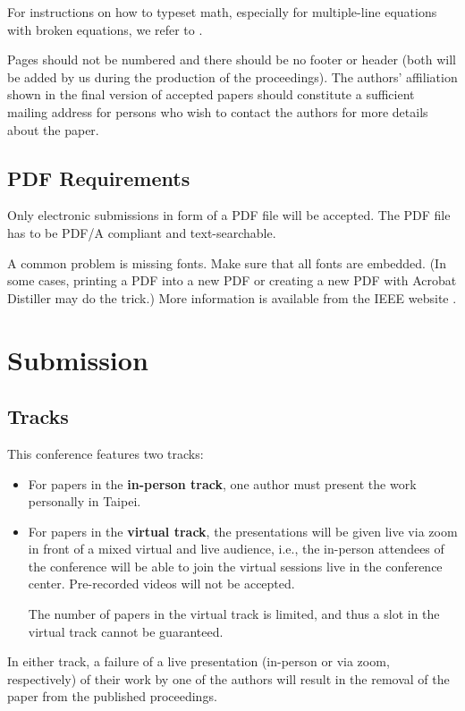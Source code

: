 \documentclass[conference,a4paper]{IEEEtran}
\begin{document}
For instructions on how to typeset math, especially for multiple-line
equations with broken equations, we refer to \cite{typesetmoser}.

Pages should not be numbered and there should be no footer or header
(both will be added by us during the production of the
proceedings). The authors' affiliation shown in the final version of
accepted papers should constitute a sufficient mailing address for
persons who wish to contact the authors for more details about the
paper.


\subsection{PDF Requirements}
\label{sec:pdf-requirements}

Only electronic submissions in form of a PDF file will be
accepted. The PDF file has to be PDF/A compliant and text-searchable.

A common problem is missing fonts. Make sure that all fonts are
embedded. (In some cases, printing a PDF into a new PDF or creating a
new PDF with Acrobat Distiller may do the trick.) More information is
available from the IEEE website \cite{IEEE:AuthorToolbox}.

\enlargethispage{-1.4cm} 


\section{Submission}
\label{sec:submission}

\subsection{Tracks}
\label{sec:tracks}

This conference features two tracks:
\begin{itemize}
\item For papers in the \textbf{in-person track}, one author must
  present the work personally in Taipei.
\item For papers in the \textbf{virtual track}, the presentations will
  be given live via zoom in front of a mixed virtual and live
  audience, i.e., the in-person attendees of the conference will be
  able to join the virtual sessions live in the conference
  center. Pre-recorded videos will not be accepted.

  The number of papers in the virtual track is limited, and thus a
  slot in the virtual track cannot be guaranteed.
\end{itemize}
In either track, a failure of a live presentation (in-person or via
zoom, respectively) of their work by one of the authors will result in
the removal of the paper from the published proceedings.
\end{document}
